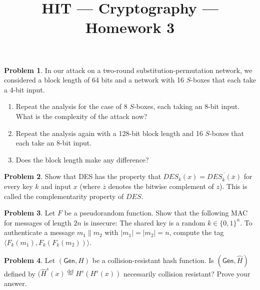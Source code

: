 \documentclass[11pt]{article}
\title{HIT --- Cryptography --- Homework 3}
\theoremstyle{definition}
\providecommand{\abs}[1]{\lvert#1\rvert}
\newtheorem{problem}{Problem}
\begin{document}
\maketitle

\begin{problem}
In our attack on a two-round substitution-permutation network, we considered a block length of 64 bits and a network with 16 $S$-boxes that each take a 4-bit input. 
\begin{enumerate}
\item Repeat the analysis for the case of 8 $S$-boxes, each taking an 8-bit input. What is the complexity of the attack now?
\item Repeat the analysis again with a 128-bit block length and 16 $S$-boxes that each take an 8-bit input.
\item Does the block length make any difference?
\end{enumerate}
\end{problem}

\begin{problem}
Show that DES has the property that $DES_k(x) = \overline{DES_{\overline{k}}(\overline{x})}$ for every key $k$ and input $x$ (where $\overline{z}$ denotes the bitwise complement of $z$). This is called the complementarity property of $DES$.
\end{problem}

\begin{problem}
Let $F$ be a pseudorandom function. Show that the following MAC for messages of length $2n$ is insecure: The shared key is a random $k\in \{0,1\}^n$. To authenticate a message $m_1\| m_2$ with $\abs{m_1} =\abs{m_2} = n$, compute the tag $\langle F_k(m_1), F_k(F_k(m_2))\rangle$. 
\end{problem}

\begin{problem}
Let $(\mathsf{Gen},H)$ be a collision-resistant hash function. Is $(\mathsf{Gen},\hat{H})$ defined by $(\hat{H}^s(x) \overset{\text{def}}{=} H^s(H^s(x))$ necessarily collision resistant? Prove your answer. 
\end{problem}
\end{document}
